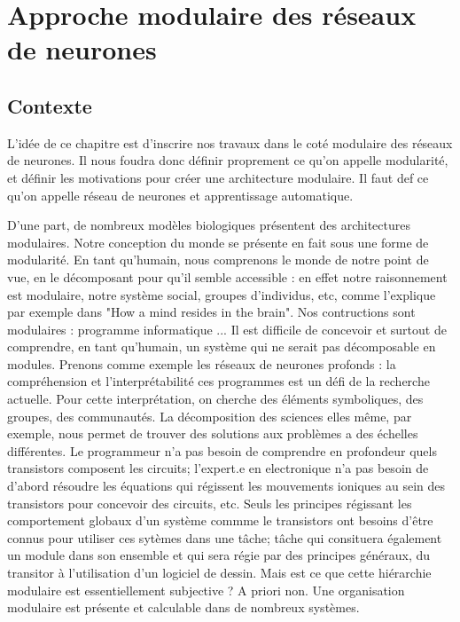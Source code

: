 \chapter{Approche modulaire des réseaux de neurones}
\graphicspath{{01-Modularite/}}

\minitoc

\section{Contexte}
L'idée de ce chapitre est d'inscrire nos travaux dans le coté modulaire des réseaux de neurones. Il nous foudra donc définir proprement ce qu'on appelle modularité, et définir les motivations pour créer une architecture modulaire. Il faut def ce qu'on appelle réseau de neurones et apprentissage automatique. 

D'une part, de nombreux modèles biologiques présentent des architectures modulaires. Notre conception du monde se présente en fait sous une forme de modularité. En tant qu'humain, nous comprenons le monde de notre point de vue, en le décomposant pour qu'il semble accessible : en effet notre raisonnement est modulaire, notre système social, groupes d'individus, etc, comme l'explique par exemple \cite{Morowitz1995TheMT} dans "How a mind resides in the brain".
Nos contructions sont modulaires : programme informatique ... Il est difficile de concevoir et surtout de comprendre, en tant qu'humain, un système qui ne serait pas décomposable en modules. Prenons comme exemple les réseaux de neurones profonds : la compréhension  et l'interprétabilité ces programmes est un défi de la recherche actuelle. Pour cette interprétation, on cherche des éléments symboliques, des groupes, des communautés. 
La décomposition des sciences elles même, par exemple, nous permet de trouver des solutions aux problèmes a des échelles différentes. Le programmeur n'a pas besoin de comprendre en profondeur quels transistors composent les circuits; l'expert.e en electronique n'a pas besoin de d'abord résoudre les équations qui régissent les mouvements ioniques au sein des transistors pour concevoir des circuits, etc. Seuls les principes régissant les comportement globaux d'un système commme le transistors ont besoins d'être connus pour utiliser ces sytèmes dans une tâche; tâche qui consituera également un module dans son ensemble et qui sera régie par des principes généraux, du transitor à l'utilisation d'un logiciel de dessin. 
Mais est ce que cette hiérarchie modulaire est essentiellement subjective ? A priori non. Une organisation modulaire est présente et calculable dans de nombreux systèmes.


